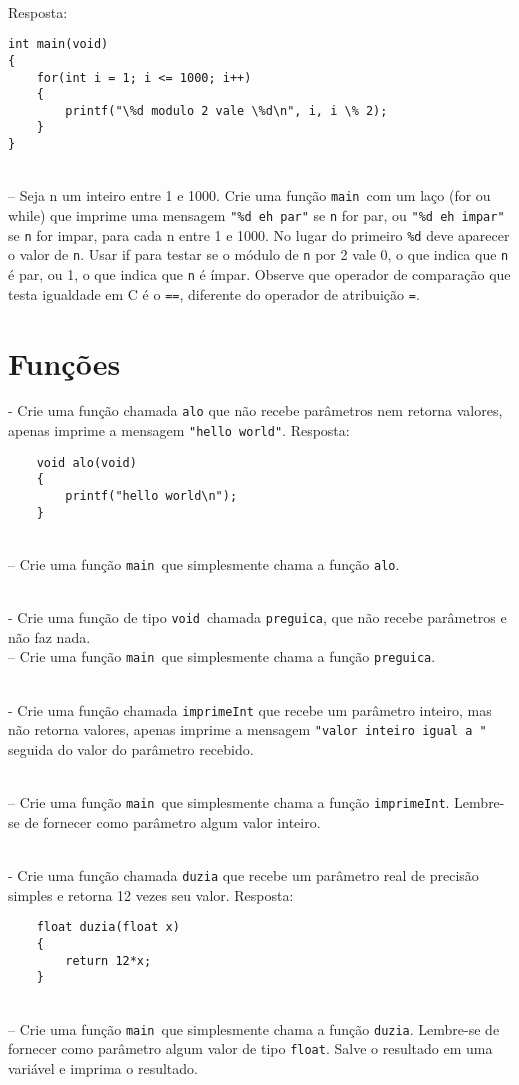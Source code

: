 \documentclass{book}
\newcommand{\NEWLINE}{~\\}
\newcommand{\VOID}{{\tt void}}
\newcommand{\FLOAT}{{\tt float}}
\newcommand{\MAIN}{{\tt main}}
\begin{document}
\NEWLINE
	Resposta:

\begin{lstlisting}
int main(void)
{
    for(int i = 1; i <= 1000; i++)
    {
        printf("\%d modulo 2 vale \%d\n", i, i \% 2);
    }
}
\end{lstlisting}
\NEWLINE
\quest – Seja n um inteiro entre 1 e 1000. Crie uma função \MAIN\ com um laço (for ou while) que imprime uma mensagem \verb|"%d eh par"| se {\tt n} for par, ou \verb|"%d eh impar"| se {\tt n} for impar, para cada n entre 1 e 1000. No lugar do primeiro \verb|%d| deve aparecer o valor de {\tt n}. Usar if para testar se o módulo de {\tt n} por 2 vale 0, o que indica que {\tt n} é par, ou 1, o que indica que {\tt n} é ímpar. Observe que operador de comparação que testa igualdade em C é o {\tt ==}, diferente do operador de atribuição {\tt =}.



\zeraquest

\section{Funções}

\quest - Crie uma função chamada {\tt alo} que não recebe parâmetros nem retorna valores, apenas imprime a mensagem \verb|"hello world"|.
	Resposta:
\begin{lstlisting}
	void alo(void)
	{
		printf("hello world\n");
	}
\end{lstlisting}
\NEWLINE
\quest – Crie uma função \MAIN\ que simplesmente chama a função {\tt alo}.

\NEWLINE
\quest - Crie uma função de tipo \VOID\ chamada {\tt preguica}, que não recebe parâmetros e não faz nada.
\NEWLINE
\quest – Crie uma função \MAIN\ que simplesmente chama a função {\tt preguica}.

\NEWLINE
\quest - Crie uma função chamada {\tt imprimeInt} que recebe um parâmetro inteiro, mas não retorna valores, apenas imprime a mensagem \verb|"valor inteiro igual a "| seguida do valor do parâmetro recebido.

\NEWLINE
\quest – Crie uma função \MAIN\ que simplesmente chama a função {\tt imprimeInt}. Lembre-se de fornecer como parâmetro algum valor inteiro.

\NEWLINE
\quest - Crie uma função chamada {\tt duzia} que recebe um parâmetro real de precisão simples e retorna 12 vezes seu valor.
	Resposta:
\begin{lstlisting}
	float duzia(float x)
	{
		return 12*x;
	}
\end{lstlisting}
\NEWLINE
\quest – Crie uma função \MAIN\ que simplesmente chama a função {\tt duzia}. Lembre-se de fornecer como parâmetro algum valor de tipo \FLOAT. Salve o resultado em uma variável e imprima o resultado.
\end{document}
